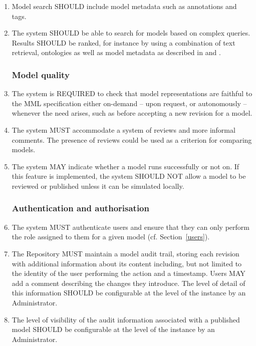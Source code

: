\begin{enumerate}[1]
\item Model search SHOULD include model metadata such as annotations and tags.

\item The system SHOULD be able to search for models based on complex queries. Results SHOULD be ranked, for instance by using a combination of text retrieval, ontologies as well as model metadata as described in \cite{Henkel2010} and \cite{Schulz2011}. 

\subsubsection{Model quality}
\item The system is REQUIRED to check that model representations are faithful to the MML specification either on-demand -- upon request, or autonomously -- whenever the need arises, such as before accepting a new revision for a model. 

\item The system MUST accommodate a system of reviews and more informal comments. The presence of reviews could be used as a criterion for comparing models.

\item The system MAY indicate whether a model runs successfully or not on. If this feature is implemented, the system SHOULD NOT allow a model to be reviewed or published unless it can be simulated locally. 

\subsubsection{Authentication and authorisation}
\item The system MUST authenticate users and ensure that they can only perform the role assigned to them for a given model (cf. Section~\ref{users}).

\item The Repository MUST maintain a model \gls{audit trail}, storing each revision with additional information about its content including, but not limited to the identity of the user performing the action and a timestamp. Users MAY add a comment describing the changes they introduce. The level of detail of this information SHOULD be configurable at the level of the instance by an Administrator. 

\item The level of visibility of the audit information associated with a published model SHOULD be configurable at the level of the instance by an Administrator.


\end{enumerate}
